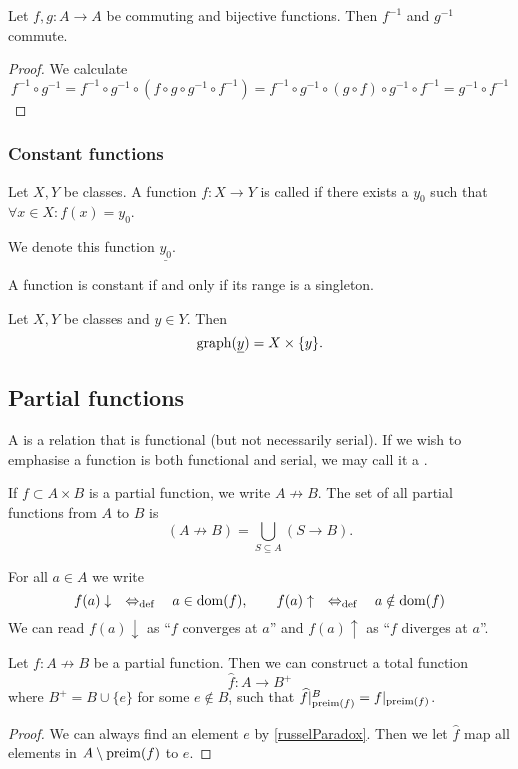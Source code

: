 \begin{lemma} \label{commutationInverse}
Let $f, g:A\to A$ be commuting and bijective functions. Then $f^{-1}$ and $g^{-1}$ commute.
\end{lemma}
\begin{proof}
We calculate
\[ f^{-1}\circ g^{-1} = f^{-1}\circ g^{-1}\circ (f\circ g \circ g^{-1} \circ f^{-1}) = f^{-1}\circ g^{-1}\circ (g\circ f) \circ g^{-1} \circ f^{-1} = g^{-1} \circ f^{-1} \]
\end{proof}

\subsubsection{Constant functions}
\begin{definition}
Let $X,Y$ be classes. A function $f:X\to Y$ is called  if there exists a $y_0$ such that $\forall x\in X: f(x) = y_0$.

We denote this function $\underline{y_0}$.
\end{definition}

A function is constant if and only if its range is a singleton.

\begin{lemma}
Let $X,Y$ be classes and $y\in Y$. Then
\[ \operatorname{graph}(\underline{y}) = X\times \{y\}. \]
\end{lemma}

\subsection{Partial functions}
\begin{definition}
A  is a relation that is functional (but not necessarily serial). If we wish to emphasise a function is both functional and serial, we may call it a .
\end{definition}
If $f\subset A\times B$ is a partial function, we write $A\not \to B$. The set of all partial functions from $A$ to $B$ is
\[ (A\not \to B) = \bigcup _{S\subseteq A}(S\to B). \]

For all $a\in A$ we write
\[ f(a)\downarrow \quad\Leftrightarrow_{\text{def}}\quad a\in\operatorname{dom}(f),\qquad f(a)\uparrow \quad\Leftrightarrow_{\text{def}}\quad a\notin\operatorname{dom}(f) \]
We can read $f(a)\downarrow$ as ``$f$ converges at $a$'' and $f(a)\uparrow$ as ``$f$ diverges at $a$''.

\begin{lemma} \label{partialFunctionExtension}
Let $f: A \not\to B$ be a partial function. Then we can construct a total function
\[ \widehat{f}: A \to B^+ \]
where $B^+ = B\cup \{e\}$ for some $e\notin B$, such that $\widehat{f}|_{\operatorname{preim}(f)}^B = f|_{\operatorname{preim}(f)}$.
\end{lemma}
\begin{proof}
We can always find an element $e$ by \ref{russelParadox}. Then we let $\widehat{f}$ map all elements in $A\setminus\operatorname{preim}(f)$ to $e$.
\end{proof}


